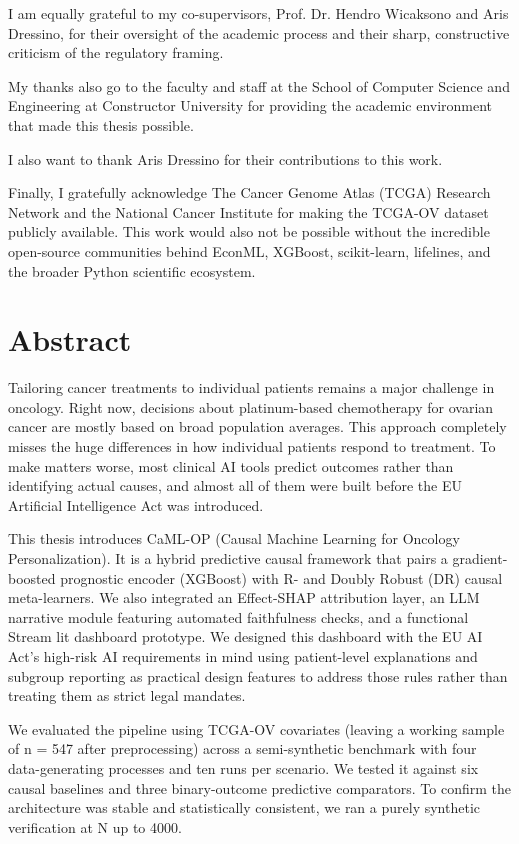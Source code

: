 I am equally grateful to my co-supervisors, Prof. Dr. Hendro Wicaksono and Aris Dressino, for their oversight of the academic process and their sharp, constructive criticism of the regulatory framing.

My thanks also go to the faculty and staff at the School of Computer Science and Engineering at Constructor University for providing the academic environment that made this thesis possible.

I also want to thank Aris Dressino for their contributions to this work.

Finally, I gratefully acknowledge The Cancer Genome Atlas (TCGA) Research Network and the National Cancer Institute for making the TCGA-OV dataset publicly available. This work would also not be possible without the incredible open-source communities behind EconML, XGBoost, scikit-learn, lifelines, and the broader Python scientific ecosystem.

\chapter*{Abstract}

Tailoring cancer treatments to individual patients remains a major challenge in oncology. Right now, decisions about platinum-based chemotherapy for ovarian cancer are mostly based on broad population averages. This approach completely misses the huge differences in how individual patients respond to treatment. To make matters worse, most clinical AI tools predict outcomes rather than identifying actual causes, and almost all of them were built before the EU Artificial Intelligence Act was introduced.

This thesis introduces CaML-OP (Causal Machine Learning for Oncology Personalization). It is a hybrid predictive causal framework that pairs a gradient-boosted prognostic encoder (XGBoost) with R- and Doubly Robust (DR) causal meta-learners. We also integrated an Effect-SHAP attribution layer, an LLM narrative module featuring automated faithfulness checks, and a functional Stream lit dashboard prototype. We designed this dashboard with the EU AI Act's high-risk AI requirements in mind using patient-level explanations and subgroup reporting as practical design features to address those rules rather than treating them as strict legal mandates.

We evaluated the pipeline using TCGA-OV covariates (leaving a working sample of n = 547 after preprocessing) across a semi-synthetic benchmark with four data-generating processes and ten runs per scenario. We tested it against six causal baselines and three binary-outcome predictive comparators. To confirm the architecture was stable and statistically consistent, we ran a purely synthetic verification at N up to 4000.

